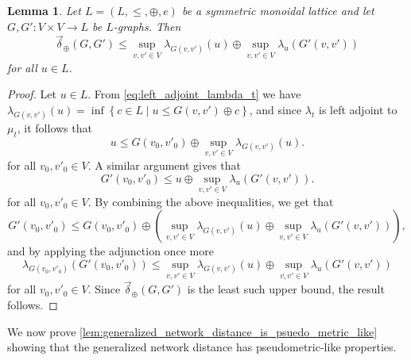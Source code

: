 \documentclass[a4paper,11pt]{article}
\newcommand{\atensor}{\oplus}
\newcounter{dummy}\numberwithin{dummy}{section}
\newtheorem{lemma}[dummy]{Lemma}
\theoremstyle{remark}
\begin{document}
\begin{appendices}
\begin{lemma}\label{lem:adjoint_sup_triangle_inequality}
Let $L=(L,\leq,\atensor,e)$ be a symmetric monoidal lattice and let $G,G'\colon V\times V\to L$ be $L$-graphs. Then
\begin{equation*}
    \vec{\delta}_\atensor(G,G')\leq\sup_{v,v'\in V}\lambda_{G(v,v')}\left(u\right)\atensor\sup_{v,v'\in V}\lambda_u\left(G'(v,v')\right)
\end{equation*}
for all $u\in L$.
\end{lemma}
\begin{proof}
Let $u\in L$. From \cref{eq:left_adjoint_lambda_t} we have $\lambda_{G(v,v')}(u)=\inf\left\{c\in L\mid u\leq G(v,v')\atensor c\right\}$, and since $\lambda_t$ is left adjoint to $\mu_t$, it follows that 
\begin{equation*}
u\leq G(v_0,v'_0)\atensor\sup_{v,v'\in V}\lambda_{G(v,v')}(u).
\end{equation*}
for all $v_0,v'_0\in V$. A similar argument gives that
\begin{equation*}
G'(v_0,v'_0)\leq u\atensor\sup_{v,v'\in V}\lambda_u\left(G'(v,v')\right).    
\end{equation*}
for all $v_0,v'_0\in V$. By combining the above inequalities, we get that
\begin{equation*}
G'(v_0,v'_0)\leq G(v_0,v'_0)\atensor\left(\sup_{v,v'\in V}\lambda_{G(v,v')}(u)\atensor\sup_{v,v'\in V}\lambda_u\left(G'(v,v')\right)\right), 
\end{equation*}
and by applying the adjunction once more
\begin{equation*}
\lambda_{G(v_0,v'_0)}\left(G'(v_0,v'_0)\right)\leq\sup_{v,v'\in V}\lambda_{G(v,v')}(u)\atensor\sup_{v,v'\in V}\lambda_u\left(G'(v,v')\right)
\end{equation*}
for all $v_0,v'_0\in V$. Since $\vec{\delta}_\atensor(G,G')$ is the least such upper bound, the result follows.
\end{proof}

We now prove \cref{lem:generalized_network_distance_is_psuedo_metric_like} showing that the generalized network distance has pseudometric-like properties.


\end{appendices}
\end{document}

